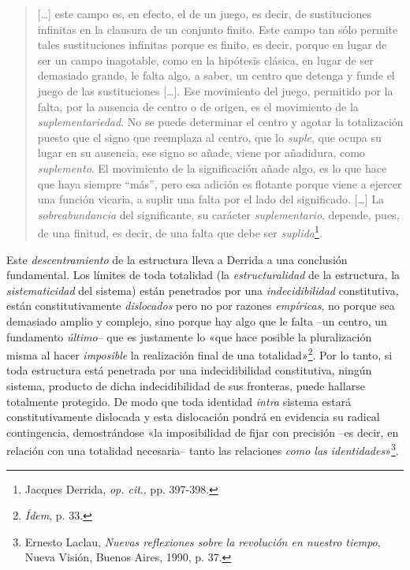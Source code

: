 \begin{quote}
{[}\ldots{]} este campo es, en efecto, el de un juego, es decir, de sustituciones infinitas en la clausura de un conjunto finito. Este campo tan sólo permite tales sustituciones infinitas porque es finito, es decir, porque en lugar de ser un campo inagotable, como en la hipótesis clásica, en lugar de ser demasiado grande, le falta algo, a saber, un centro que detenga y funde el juego de las sustituciones {[}\ldots{]}. Ese movimiento del juego, permitido por la falta, por la ausencia de centro o de origen, es el movimiento de la \emph{suplementariedad}. No se puede determinar el centro y agotar la totalización puesto que el signo que reemplaza al centro, que lo \emph{suple}, que ocupa su lugar en su ausencia, ese signo se añade, viene por añadidura, como \emph{suplemento}. El movimiento de la significación añade algo, es lo que hace que haya siempre ``más'', pero esa adición es flotante porque viene a ejercer una función vicaria, a suplir una falta por el lado del significado. {[}\ldots{]} La \emph{sobreabundancia} del significante, su carácter \emph{suplementario}, depende, pues, de una finitud, es decir, de una falta que debe ser \emph{suplida}\footnote{Jacques Derrida, \emph{op. cit}., pp. 397-398.}.
\end{quote}

Este \emph{descentramiento} de la estructura lleva a Derrida a una conclusión fundamental. Los límites de toda totalidad (la \emph{estructuralidad} de la estructura, la \emph{sistematicidad} del sistema) están penetrados por una \emph{indecidibilidad} constitutiva, están constitutivamente \emph{dislocados} pero no por razones \emph{empíricas}, no porque sea demasiado amplio y complejo, sino porque hay algo que le falta --un centro, un fundamento \emph{último}-- que es justamente lo «que hace posible la pluralización misma al hacer \emph{imposible} la realización final de una totalidad»\footnote{\emph{Ídem}, p. 33.}. Por lo tanto, si toda estructura está penetrada por una indecidibilidad constitutiva, ningún sistema, producto de dicha indecidibilidad de sus fronteras, puede hallarse totalmente protegido. De modo que toda identidad \emph{intra} sistema estará constitutivamente dislocada y esta dislocación pondrá en evidencia su radical contingencia, demostrándose «la imposibilidad de fijar con precisión --es decir, en relación con una totalidad necesaria-- tanto las relaciones \emph{como las identidades}»\footnote{Ernesto Laclau, \emph{Nuevas reflexiones sobre la revolución en nuestro tiempo}, Nueva Visión, Buenos Aires, 1990, p. 37.}.


